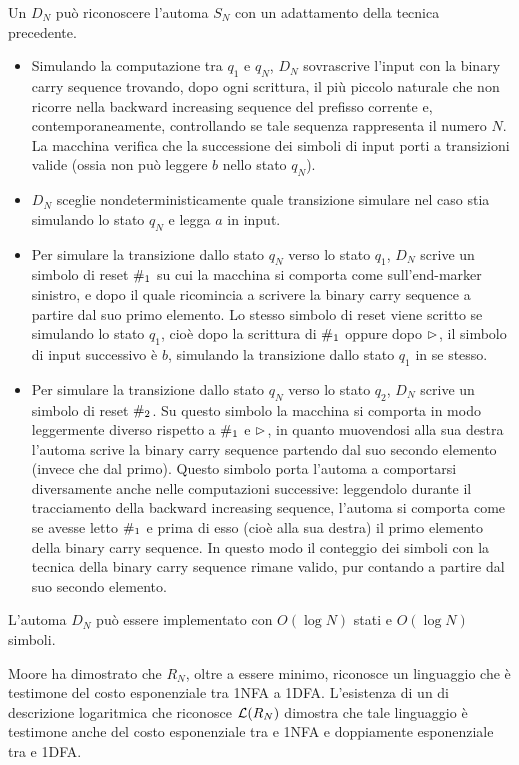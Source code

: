 Un  $D_N$ può riconoscere l'automa $S_N$ con un adattamento della tecnica precedente.
\begin{itemize}
	\item Simulando la computazione tra $q_1$ e $q_N$, $D_N$ sovrascrive l'input con la binary carry sequence trovando, dopo ogni scrittura, il più piccolo naturale che non ricorre nella backward increasing sequence del prefisso corrente e, contemporaneamente, controllando se tale sequenza rappresenta il numero $N$. La macchina verifica che la successione dei simboli di input porti a transizioni valide (ossia non può leggere $b$ nello stato $q_N$).
	\item $D_N$ sceglie nondeterministicamente quale transizione simulare nel caso stia simulando lo stato $q_N$ e legga $a$ in input.
	\item Per simulare la transizione dallo stato $q_N$ verso lo stato $q_1$, $D_N$ scrive un simbolo di reset $\#_1$ su cui la macchina si comporta come sull'end-marker sinistro, e dopo il quale ricomincia a scrivere la binary carry sequence a partire dal suo primo elemento. Lo stesso simbolo di reset viene scritto se simulando lo stato $q_1$, cioè dopo la scrittura di $\#_1$ oppure dopo $\rhd$, il simbolo di input successivo è $b$, simulando la transizione dallo stato $q_1$ in se stesso.
	\item Per simulare la transizione dallo stato $q_N$ verso lo stato $q_2$, $D_N$ scrive un simbolo di reset $\#_2$. Su questo simbolo la macchina si comporta in modo leggermente diverso rispetto a $\#_1$ e $\rhd$, in quanto muovendosi alla sua destra l'automa scrive la binary carry sequence partendo dal suo secondo elemento (invece che dal primo). Questo simbolo porta l'automa a comportarsi diversamente anche nelle computazioni successive: leggendolo durante il tracciamento della backward increasing sequence, l'automa si comporta come se avesse letto $\#_1$ e prima di esso (cioè alla sua destra) il primo elemento della binary carry sequence. In questo modo il conteggio dei simboli con la tecnica della binary carry sequence rimane valido, pur contando a partire dal suo secondo elemento.
\end{itemize}
L'automa $D_N$ può essere implementato con $O(\log N)$ stati e $O(\log N)$ simboli.

Moore ha dimostrato che $R_N$, oltre a essere minimo, riconosce un linguaggio che è testimone del costo esponenziale tra 1NFA a 1DFA. L'esistenza di un  di descrizione logaritmica che riconosce $\mathcal L(R_N)$ dimostra che tale linguaggio è testimone anche del costo esponenziale tra  e 1NFA e doppiamente esponenziale tra  e 1DFA.
